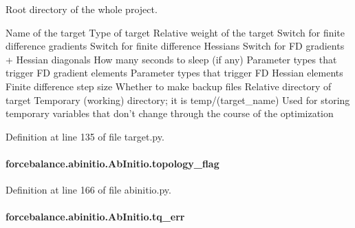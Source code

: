 Root directory of the whole project. 

Name of the target Type of target Relative weight of the target Switch for finite difference gradients Switch for finite difference Hessians Switch for F\-D gradients + Hessian diagonals How many seconds to sleep (if any) Parameter types that trigger F\-D gradient elements Parameter types that trigger F\-D Hessian elements Finite difference step size Whether to make backup files Relative directory of target Temporary (working) directory; it is temp/(target\-\_\-name) Used for storing temporary variables that don't change through the course of the optimization 

Definition at line 135 of file target.\-py.

\hypertarget{classforcebalance_1_1abinitio_1_1AbInitio_a09689e626b75720b097c36f922507950}{
\paragraph[{topology\-\_\-flag}]{\setlength{\rightskip}{0pt plus 5cm}forcebalance.\-abinitio.\-Ab\-Initio.\-topology\-\_\-flag\hspace{0.3cm}{\ttfamily [inherited]}}}\label{classforcebalance_1_1abinitio_1_1AbInitio_a09689e626b75720b097c36f922507950}


Definition at line 166 of file abinitio.\-py.

\hypertarget{classforcebalance_1_1abinitio_1_1AbInitio_ae60e834d5b5bf13f8fb70d403a97db28}{
\paragraph[{tq\-\_\-err}]{\setlength{\rightskip}{0pt plus 5cm}forcebalance.\-abinitio.\-Ab\-Initio.\-tq\-\_\-err\hspace{0.3cm}{\ttfamily [inherited]}}}\label{classforcebalance_1_1abinitio_1_1AbInitio_ae60e834d5b5bf13f8fb70d403a97db28}


